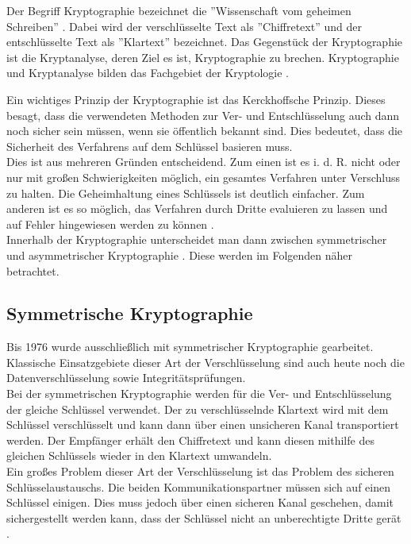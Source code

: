 	Der Begriff Kryptographie bezeichnet die ''Wissenschaft vom geheimen Schreiben'' \cite{Waetjen2018}. Dabei wird der verschlüsselte Text als ''Chiffretext'' und der entschlüsselte Text als ''Klartext'' bezeichnet. Das Gegenstück der Kryptographie ist die Kryptanalyse, deren Ziel es ist, Kryptographie zu brechen. Kryptographie und Kryptanalyse bilden das Fachgebiet der Kryptologie \cite{Paar2010}.
	
	Ein wichtiges Prinzip der Kryptographie ist das Kerckhoffsche Prinzip. Dieses besagt, dass die verwendeten Methoden zur Ver- und Entschlüsselung auch dann noch sicher sein müssen, wenn sie öffentlich bekannt sind. Dies bedeutet, dass die Sicherheit des Verfahrens auf dem Schlüssel basieren muss.\\
	
	Dies ist aus mehreren Gründen entscheidend. Zum einen ist es i. d. R. nicht oder nur mit großen Schwierigkeiten möglich, ein gesamtes Verfahren unter Verschluss zu halten. Die Geheimhaltung eines Schlüssels ist deutlich einfacher. Zum anderen ist es so möglich, das Verfahren durch Dritte evaluieren zu lassen und auf Fehler hingewiesen werden zu können \cite{Kuesters2011-A}.\\
	
	Innerhalb der Kryptographie unterscheidet man dann zwischen symmetrischer und asymmetrischer Kryptographie \cite{Paar2010}. Diese werden im Folgenden näher betrachtet.
	
		\subsection{Symmetrische Kryptographie}
		\label{subsec:grundlagen:krypto:sym}
		
		Bis 1976 wurde ausschließlich mit symmetrischer Kryptographie gearbeitet. Klassische Einsatzgebiete dieser Art der Verschlüsselung sind auch heute noch die Datenverschlüsselung sowie Integritätsprüfungen.\\
		
		Bei der symmetrischen Kryptographie werden für die Ver- und Entschlüsselung der gleiche Schlüssel verwendet. Der zu verschlüsselnde Klartext wird mit dem Schlüssel verschlüsselt und kann dann über einen unsicheren Kanal transportiert werden. Der Empfänger erhält den Chiffretext und kann diesen mithilfe des gleichen Schlüssels wieder in den Klartext umwandeln.\\
		
		Ein großes Problem dieser Art der Verschlüsselung ist das Problem des sicheren Schlüsselaustauschs. Die beiden Kommunikationspartner müssen sich auf einen Schlüssel einigen. Dies muss jedoch über einen sicheren Kanal geschehen, damit sichergestellt werden kann, dass der Schlüssel nicht an unberechtigte Dritte gerät \cite{Paar2010}.\\
		
